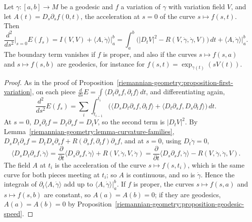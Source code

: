 \begin{proposition}\label{riemannian-geometry:proposition-second-variation}
Let $\gamma \colon [a, b] \to M$ be a geodesic and $f$ a variation of $\gamma$ with variation field $V$, and let $A(t) = D_s\partial_sf(0, t)$, the acceleration at $s = 0$ of
the curve $s \mapsto f(s, t)$. Then
\[
\frac{d^2}{ds^2}\Big|_{s=0}E(f_s) = I(V, V) + \langle A, \dot\gamma\rangle\Big|_a^b = \int_a^b\bigl(|D_tV|^2 - R(V, \dot\gamma, \dot\gamma, V)\bigr)\,dt + \langle A, \dot\gamma\rangle\Big|_a^b .
\]
The boundary term vanishes if $f$ is proper, and also if the curves $s \mapsto f(s, a)$ and $s \mapsto f(s, b)$ are geodesics, for instance for
$f(s, t) = \exp_{\gamma(t)}(sV(t))$.
\end{proposition}

\begin{proof}
As in the proof of Proposition~\ref{riemannian-geometry:proposition-first-variation}, on each piece $\frac{d}{ds}E = \int\langle D_t\partial_sf, \partial_tf\rangle\,dt$, and
differentiating again,
\[
\frac{d^2}{ds^2}E(f_s) = \sum_i\int_{t_{i-1}}^{t_i}\bigl(\langle D_sD_t\partial_sf, \partial_tf\rangle + \langle D_t\partial_sf, D_s\partial_tf\rangle\bigr)\,dt .
\]
At $s = 0$, $D_s\partial_tf = D_t\partial_sf = D_tV$, so the second term is $|D_tV|^2$. By Lemma~\ref{riemannian-geometry:lemma-curvature-families},
$D_sD_t\partial_sf = D_tD_s\partial_sf + R(\partial_sf, \partial_tf)\partial_sf$, and at $s = 0$, using $D_t\dot\gamma = 0$,
\[
\langle D_sD_t\partial_sf, \dot\gamma\rangle = \frac{\partial}{\partial t}\langle D_s\partial_sf, \dot\gamma\rangle + R(V, \dot\gamma, V, \dot\gamma)
= \frac{\partial}{\partial t}\langle D_s\partial_sf, \dot\gamma\rangle - R(V, \dot\gamma, \dot\gamma, V).
\]
The field $A$ at $t_i$ is the acceleration of the curve $s \mapsto f(s, t_i)$, which is the same curve for both pieces meeting at $t_i$; so $A$ is continuous, and so is
$\dot\gamma$. Hence the integrals of $\partial_t\langle A, \dot\gamma\rangle$ add up to $\langle A, \dot\gamma\rangle|_a^b$. If $f$ is proper, the curves $s \mapsto f(s, a)$
and $s \mapsto f(s, b)$ are constant, so $A(a) = A(b) = 0$; if they are geodesics, $A(a) = A(b) = 0$ by Proposition~\ref{riemannian-geometry:proposition-geodesic-speed}.
\end{proof}


